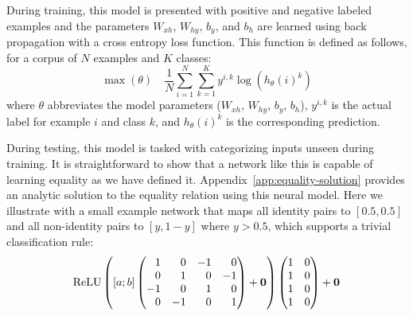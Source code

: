 \documentclass{article}
\newcommand{\Appref}[1]{Appendix~\ref{#1}}
\newcommand{\update}[1]{{\color{darkblue}#1}}
\DeclareMathOperator{\ReLU}{ReLU}
\begin{document}
During training, this model is presented with positive and negative labeled examples and the parameters $W_{xh}$, $W_{hy}$, $b_{y}$, and $b_{h}$ are learned using back propagation with a cross entropy loss function. \update{This function is defined as follows, for a corpus of $N$ examples and $K$ classes:
%
\begin{equation}
  \max(\theta)
  \quad
  \frac{1}{N}
  \sum_{i=1}^{N}
  \sum_{k=1}^{K}
  y^{i,k} \log(h_{\theta}(i)^{k})
\end{equation}
%
where $\theta$ abbreviates the model parameters ($W_{xh}$, $W_{hy}$, $b_{y}$, $b_{h}$), $y^{i,k}$ is the actual label for example $i$ and class $k$, and $h_{\theta}(i)^{k}$ is the corresponding prediction.}

During testing, this model is tasked with categorizing inputs unseen during training.  It is straightforward to show that a network like this is capable of learning equality as we have defined it. \Appref{app:equality-solution} provides an analytic solution to the equality relation using this neural model.  \update{Here we illustrate with a small example network that maps all identity pairs to $[0.5, 0.5]$ and all non-identity pairs to $[y, 1-y]$ where $y > 0.5$, which supports a trivial classification rule:
%
\setlength{\arraycolsep}{4pt}
\begin{equation}
  \ReLU\left(
    [a;b]
    \left(
      \begin{array}[c]{@{} *{4}{r} @{}}
        1 &  0 &  -1 & 0  \\
        0 &  1 &  0 & -1 \\
        -1 &  0 &  1 & 0  \\
        0 &  -1 &  0 & 1
      \end{array}
    \right)
    +
    \mathbf{0}
  \right)
  \left(
    \begin{array}[c]{@{} r r @{}}
      1 & 0 \\
      1 & 0\\
      1 & 0\\
      1 & 0\\
    \end{array}
  \right)
  +
  \mathbf{0}
\end{equation}}
\end{document}
